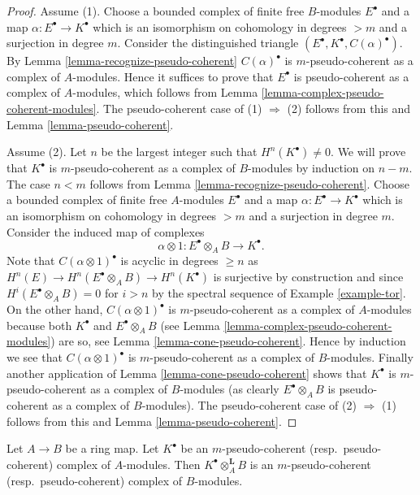 \begin{proof}
Assume (1). Choose a bounded complex of finite free $B$-modules
$E^\bullet$ and a map $\alpha : E^\bullet \to K^\bullet$ which is
an isomorphism on cohomology in degrees $> m$ and a surjection in degree $m$.
Consider the distinguished triangle
$(E^\bullet, K^\bullet, C(\alpha)^\bullet)$. By
Lemma \ref{lemma-recognize-pseudo-coherent}
$C(\alpha)^\bullet$ is $m$-pseudo-coherent as a complex of
$A$-modules. Hence it suffices to prove that $E^\bullet$ is
pseudo-coherent as a complex of $A$-modules, which follows from
Lemma \ref{lemma-complex-pseudo-coherent-modules}.
The pseudo-coherent case of (1) $\Rightarrow$ (2) follows from this and
Lemma \ref{lemma-pseudo-coherent}.

\medskip\noindent
Assume (2). Let $n$ be the largest integer such that $H^n(K^\bullet) \not = 0$.
We will prove that $K^\bullet$ is $m$-pseudo-coherent as a complex
of $B$-modules by induction on $n - m$. The case $n < m$ follows from
Lemma \ref{lemma-recognize-pseudo-coherent}.
Choose a bounded complex of finite free $A$-modules $E^\bullet$ and a
map $\alpha : E^\bullet \to K^\bullet$ which is an isomorphism on
cohomology in degrees $> m$ and a surjection in degree $m$.
Consider the induced map of complexes
$$
\alpha \otimes 1 : E^\bullet \otimes_A B \to K^\bullet.
$$
Note that $C(\alpha \otimes 1)^\bullet$ is acyclic in degrees
$\geq n$ as $H^n(E) \to H^n(E^\bullet \otimes_A B) \to H^n(K^\bullet)$
is surjective by construction and since $H^i(E^\bullet \otimes_A B) = 0$
for $i > n$ by the spectral sequence of
Example \ref{example-tor}.
On the other hand, $C(\alpha \otimes 1)^\bullet$
is $m$-pseudo-coherent as a complex of $A$-modules because
both $K^\bullet$ and $E^\bullet \otimes_A B$ (see
Lemma \ref{lemma-complex-pseudo-coherent-modules})
are so, see
Lemma \ref{lemma-cone-pseudo-coherent}.
Hence by induction we see that $C(\alpha \otimes 1)^\bullet$
is $m$-pseudo-coherent as a complex of $B$-modules. Finally
another application of
Lemma \ref{lemma-cone-pseudo-coherent}
shows that $K^\bullet$ is $m$-pseudo-coherent as a complex of $B$-modules
(as clearly $E^\bullet \otimes_A B$ is pseudo-coherent as a complex
of $B$-modules). The pseudo-coherent case
of (2) $\Rightarrow$ (1) follows from this and
Lemma \ref{lemma-pseudo-coherent}.
\end{proof}

\begin{lemma}
\label{lemma-pull-pseudo-coherent}
Let $A \to B$ be a ring map.
Let $K^\bullet$ be an $m$-pseudo-coherent (resp.\ pseudo-coherent)
complex of $A$-modules. Then $K^\bullet \otimes_A^{\mathbf{L}} B$
is an $m$-pseudo-coherent (resp.\ pseudo-coherent) complex of $B$-modules. 
\end{lemma}

